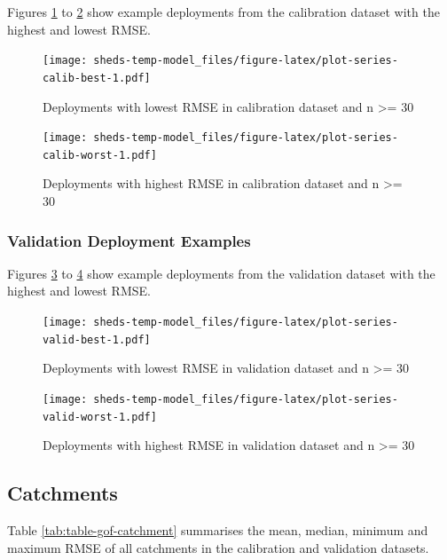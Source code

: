 \documentclass[]{book}
\begin{document}
Figures \ref{fig:plot-series-calib-best} to \ref{fig:plot-series-calib-worst} show example deployments from the calibration dataset with the highest and lowest RMSE.

\begin{figure}
\centering
\texttt{[image: sheds-temp-model\_files/figure-latex/plot-series-calib-best-1.pdf]}
\caption{\label{fig:plot-series-calib-best}Deployments with lowest RMSE in calibration dataset and n \textgreater{}= 30}
\end{figure}

\begin{figure}
\centering
\texttt{[image: sheds-temp-model\_files/figure-latex/plot-series-calib-worst-1.pdf]}
\caption{\label{fig:plot-series-calib-worst}Deployments with highest RMSE in calibration dataset and n \textgreater{}= 30}
\end{figure}

\hypertarget{validation-deployment-examples}{%
\subsubsection{Validation Deployment Examples}\label{validation-deployment-examples}}

Figures \ref{fig:plot-series-valid-best} to \ref{fig:plot-series-valid-worst} show example deployments from the validation dataset with the highest and lowest RMSE.

\begin{figure}
\centering
\texttt{[image: sheds-temp-model\_files/figure-latex/plot-series-valid-best-1.pdf]}
\caption{\label{fig:plot-series-valid-best}Deployments with lowest RMSE in validation dataset and n \textgreater{}= 30}
\end{figure}

\begin{figure}
\centering
\texttt{[image: sheds-temp-model\_files/figure-latex/plot-series-valid-worst-1.pdf]}
\caption{\label{fig:plot-series-valid-worst}Deployments with highest RMSE in validation dataset and n \textgreater{}= 30}
\end{figure}

\hypertarget{catchments}{%
\subsection{Catchments}\label{catchments}}

Table \ref{tab:table-gof-catchment} summarises the mean, median, minimum and maximum RMSE of all catchments in the calibration and validation datasets.
\end{document}
